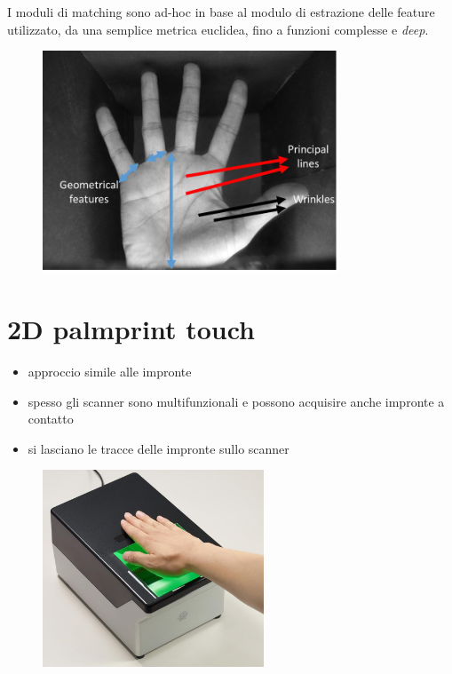 \documentclass{report}
\begin{document}
\noindent I moduli di matching sono ad-hoc in base al modulo di estrazione 
delle feature utilizzato, da una semplice metrica euclidea, fino a funzioni
complesse e \textit{deep}.

\begin{figure}[ht]
    \centering
    \includegraphics[width=0.8\linewidth]{images/palm-feature.png}
\end{figure}

\newpage
\section{2D palmprint touch}
\begin{itemize}
    \item approccio simile alle impronte 
    \item spesso gli scanner sono multifunzionali e possono acquisire anche impronte a contatto 
    \item si lasciano le tracce delle impronte sullo scanner
\end{itemize}

\begin{figure}[ht]
    \centering
    \includegraphics[width=0.5\linewidth]{images/2d-palm-touch.png}
\end{figure}
\end{document}
